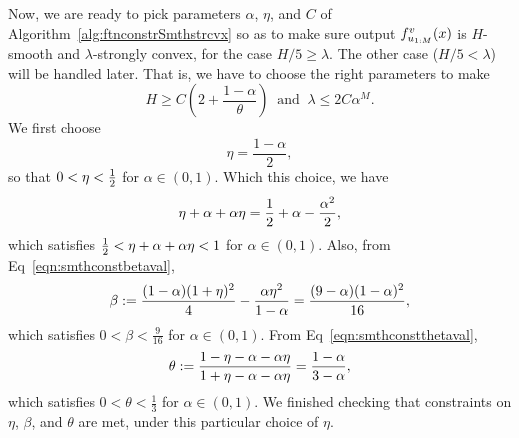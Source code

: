 Now, we are ready to pick parameters $\alpha$, $\eta$, and $C$ of Algorithm~\ref{alg:ftnconstrSmthstrcvx}
so as to make sure output $f_{u_{1:M}}^v(x)$ is $H$-smooth and $\lambda$-strongly convex, for the case $H/5\geq\lambda$. The other case ($H/5 < \lambda$) will be handled later.
That is, we have to choose the right parameters to make
\begin{equation}
\label{eq:ftnconstrsscvx2goal}
H \geq C\left ( 2 + \frac{1-\alpha}{\theta} \right) ~\text{ and }~
\lambda \leq 2C\alpha^M.
\end{equation}
We first choose 
\begin{equation*}
	\eta = \frac{1-\alpha}{2},
\end{equation*}
so that $0<\eta<\frac{1}{2}$ for $\alpha \in (0,1)$.
Which this choice, we have
\begin{equation*}
	\eta+\alpha+\alpha\eta = \frac{1}{2}+\alpha-\frac{\alpha^2}{2},
\end{equation*}
which satisfies $\frac{1}{2} < \eta+\alpha+\alpha\eta < 1$ for $\alpha \in (0,1)$.
Also, from Eq~\eqref{eqn:smthconstbetaval},
\begin{equation*}
	\beta := \frac{(1-\alpha)(1+\eta)^2}{4} - \frac{\alpha \eta^2}{1-\alpha} = \frac{(9-\alpha)(1-\alpha)^2}{16},
\end{equation*}
which satisfies $0<\beta<\frac{9}{16}$ for $\alpha \in (0,1)$.
From Eq~\eqref{eqn:smthconstthetaval},
\begin{equation*}
	\theta := \frac{1-\eta-\alpha-\alpha\eta}{1+\eta-\alpha-\alpha\eta} = \frac{1-\alpha}{3-\alpha},
\end{equation*}
which satisfies $0<\theta<\frac{1}{3}$ for $\alpha \in (0,1)$.
We finished checking that constraints on $\eta$, $\beta$, and $\theta$ are met, under this particular choice of $\eta$.

